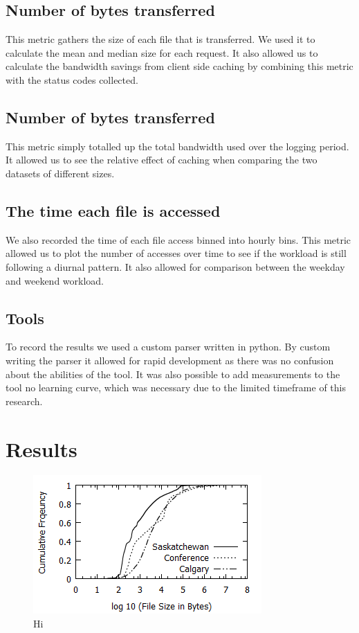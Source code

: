 \documentclass[10pt,conference]{IEEEtran}
\begin{document}
\subsection{Number of bytes transferred}
This metric gathers the size of each file that is transferred. We used it to calculate the mean and median size for each request. 
It also allowed us to calculate the bandwidth savings from client side caching by combining this metric with the status codes collected.

\subsection{Number of bytes transferred}
This metric simply totalled up the total bandwidth used over the logging period. It allowed us to see the relative effect of caching when comparing the two datasets of different sizes.

\subsection{The time each file is accessed}
We also recorded the time of each file access binned into hourly bins. This metric allowed us to plot the number of accesses over time to see if the workload is still following a diurnal pattern. It also allowed for comparison between the weekday and weekend workload.

\subsection{Tools}
To record the results we used a custom parser written in python. By custom writing the parser it allowed for rapid development as there was no confusion about the abilities of the tool. It was also possible to add measurements to the tool no learning curve, which was necessary due to the limited timeframe of this research.

\section{Results}\label{results}

\begin{figure}
    \includegraphics{images/filesize}
    \caption{Hi}\label{fig:filesize}
\end{figure}
\end{document}
